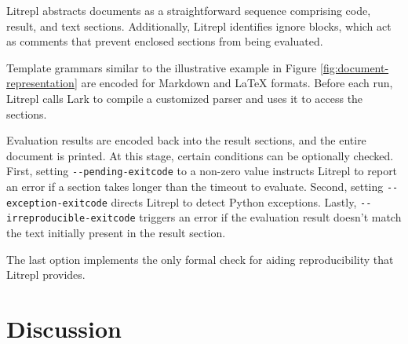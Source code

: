 \documentclass[a4paper,12pt,twocolumn]{article}
\begin{document}
Litrepl abstracts documents as a straightforward sequence comprising code,
result, and text sections. Additionally, Litrepl identifies ignore blocks, which
act as comments that prevent enclosed sections from being evaluated.

Template grammars similar to the illustrative example in Figure
\ref{fig:document-representation} are encoded for Markdown and LaTeX formats.
Before each run, Litrepl calls Lark\cite{Lark} to compile a customized parser
and uses it to access the sections.

Evaluation results are encoded back into the result sections, and the entire
document is printed. At this stage, certain conditions can be optionally
checked. First, setting \verb|--pending-exitcode| to a non-zero value instructs
Litrepl to report an error if a section takes longer than the timeout to
evaluate. Second, setting \verb|--exception-exitcode| directs Litrepl to detect
Python exceptions. Lastly, \verb|--irreproducible-exitcode| triggers an error if
the evaluation result doesn't match the text initially present in the result
section.

The last option implements the only formal check for aiding reproducibility that
Litrepl provides.

\section{Discussion}
\end{document}
